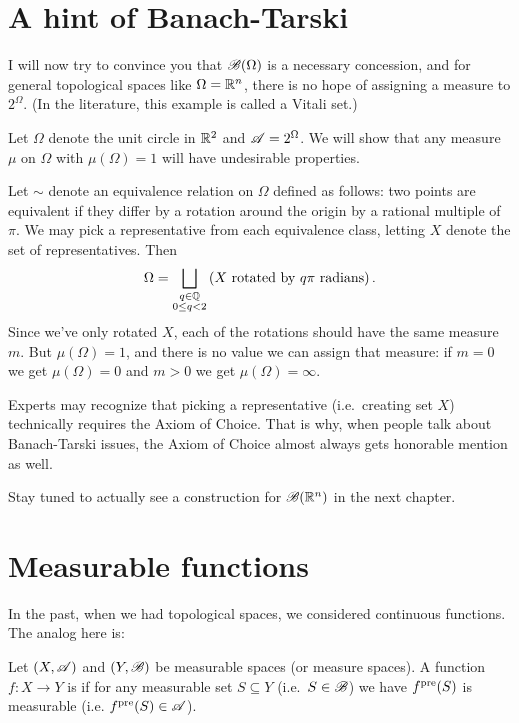 \section{A hint of Banach-Tarski}
I will now try to convince you that $\mathscr B(\Omega)$
is a necessary concession,
and for general topological spaces like $\Omega = \mathbb R^n$,
there is no hope of assigning a measure to $2^{\Omega}$.
(In the literature, this example is called a Vitali set.)
\begin{example}
	[A geometric example why $\SA = 2^\Omega$ is unsuitable]
	Let $\Omega$ denote the unit circle in $\mathbb R^2$
	and $\SA = 2^\Omega$.
	We will show that any measure $\mu$ on $\Omega$
	with $\mu(\Omega) = 1$ will have undesirable properties.

	Let $\sim$ denote an equivalence relation on $\Omega$
	defined as follows: two points are equivalent
	if they differ by a rotation around the origin by a rational multiple of $\pi$.
	We may pick a representative from each equivalence class,
	letting $X$ denote the set of representatives.
	Then
	\[ \Omega = \bigsqcup_{\substack{q \in \mathbb Q \\ 0 \le q < 2}}
		\left( X \text{ rotated by $q\pi$ radians} \right).  \]
	Since we've only rotated $X$,
	each of the rotations should have the same measure $m$.
	But $\mu(\Omega) = 1$,
	and there is no value we can assign that measure:
	if $m = 0$ we get $\mu(\Omega) = 0$
	and $m > 0$ we get $\mu(\Omega) = \infty$.
\end{example}
\begin{remark}
	[Choice]
	Experts may recognize that picking a representative
	(i.e.\ creating set $X$)
	technically requires the Axiom of Choice.
	That is why, when people talk about Banach-Tarski issues,
	the Axiom of Choice almost always gets honorable mention as well.
\end{remark}

Stay tuned to actually see a construction for $\mathscr B(\mathbb R^n)$
in the next chapter.

\section{Measurable functions}
In the past, when we had topological spaces,
we considered continuous functions.
The analog here is:
\begin{definition}
	Let $(X, \mathscr A)$ and $(Y, \mathscr B)$ be measurable spaces
	(or measure spaces).
	A function $f \colon X \to Y$ is 
	if for any measurable set $S \subseteq Y$ (i.e.\ $S \in \mathscr B$)
	we have $f^{\text{pre}}(S)$ is measurable (i.e. $f^{\text{pre}}(S) \in \mathscr A$).
\end{definition}

